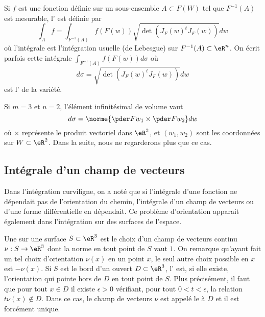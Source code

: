 Si $f$ est une fonction définie sur un sous-ensemble $A \subset F(W)$ tel que $F^{-1}(A)$ est mesurable, l' est définie par
\begin{equation*}
  \int_A f = \int_{F^{-1}(A)} f(F(w)) \sqrt{\det(J_F(w)^t {J_F(w)})} dw
\end{equation*}
où l'intégrale est l'intégration usuelle (de Lebesgue) sur $F^{-1}(A) \subset \eR^n$. On écrit parfois cette intégrale $\int_{F^{-1}(A)} f(F(w)) d\sigma$ où
\begin{equation*}
  d\sigma = \sqrt{\det(J_F(w)^t {J_F(w)})} dw
\end{equation*}
est l' de la variété. 

Si $m = 3$ et $n = 2$, l'élément infinitésimal de volume vaut
\begin{equation*}
  d \sigma = \norme{\pder F {w_1} \times \pder F {w_2}} dw
\end{equation*}
où $\times$ représente le produit vectoriel dans $\eR^3$, et $(w_1,w_2)$ sont les coordonnées sur $W \subset \eR^2$. Dans la suite, nous ne regarderons plus que ce cas.

\subsection{Intégrale d'un champ de vecteurs}
Dans l'intégration curviligne, on a noté que si l'intégrale d'une fonction ne dépendait pas de l'orientation du chemin, l'intégrale d'un champ de vecteurs ou d'une forme différentielle en dépendait. Ce problème d'orientation apparait également dans l'intégration sur des surfaces de l'espace.

Une  sur une surface $S \subset \eR^3$ est le choix
d'un champ de vecteurs continu $\nu : S \to \eR^3$ dont la norme en
tout point de $S$ vaut $1$. On remarque qu'ayant fait un tel choix
d'orientation $\nu(x)$ en un point $x$, le seul autre choix possible
en $x$ est $-\nu(x)$.
Si $S$ est le bord d'un ouvert $D \subset \eR^3$, l' est, si elle existe, l'orientation qui
pointe hors de $D$ en tout point de $S$. Plus précisément, il faut que
pour tout $x \in D$ il existe $\epsilon > 0$ vérifiant, pour tout $0 <
t < \epsilon$, la relation $t \nu(x) \notin D$. Dans ce cas, le champ
de vecteurs $\nu$ est appelé le  à $D$ et il est forcément unique.

